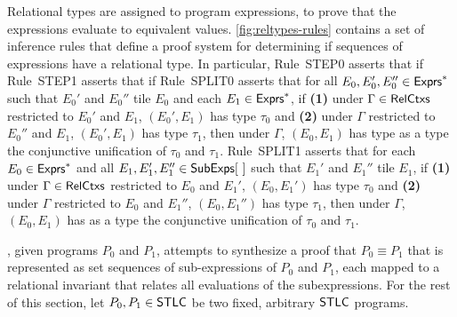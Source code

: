 %
Relational types are assigned to program expressions, to prove that
the expressions evaluate to equivalent values.
%
\autoref{fig:reltypes-rules} contains a set of inference rules that
define a proof system for determining if sequences of expressions have
a relational type.
%
In particular, Rule~STEP0 asserts that if 
%
Rule~STEP1 asserts that if
%
Rule~SPLIT0 asserts that for all $E_0, E_0', E_0'' \in \mathsf{Exprs}^{*}$ such
that $E_0'$ and $E_0''$ tile $E_0$ and %
each $E_1 \in \mathsf{Exprs}^{*}$, if %
\textbf{(1)} under $\Gamma \in \mathsf{RelCtxs}$ restricted to $E_0'$ and
$E_1$, $(E_0', E_1)$ has type $\tau_0$ and %
\textbf{(2)} under $\Gamma$ restricted to $E_0''$ and $E_1$, $(E_0',
E_1)$ has type $\tau_1$, then under $\Gamma$, $(E_0, E_1)$ has type
as a type the conjunctive unification
%
%
of $\tau_0$ and $\tau_1$.
Rule~SPLIT1 asserts that for each $E_0 \in \mathsf{Exprs}^{*}$ and %
all $E_1, E_1', E_1'' \in \subexps$ such that $E_1'$ and $E_1''$ tile
$E_1$, if %
\textbf{(1)} under $\Gamma \in \mathsf{RelCtxs}$ restricted to $E_0$ and
$E_1'$, $(E_0, E_1')$ has type $\tau_0$ and %
\textbf{(2)} under $\Gamma$ restricted to $E_0$ and $E_1''$, $(E_0,
E_1'')$ has type $\tau_1$, then under $\Gamma$, $(E_0, E_1)$ has as a
type the conjunctive unification
%
%
of $\tau_0$ and $\tau_1$.


%
\sys, given programs $P_0$ and $P_1$, attempts to synthesize a proof
that $P_0 \equiv P_1$ that is represented as set sequences of
sub-expressions of $P_0$ and $P_1$, each mapped to a relational
invariant that relates all evaluations of the subexpressions.
%
For the rest of this section, let $P_0, P_1 \in \mathsf{STLC}$ be two fixed,
arbitrary $\mathsf{STLC}$ programs.

